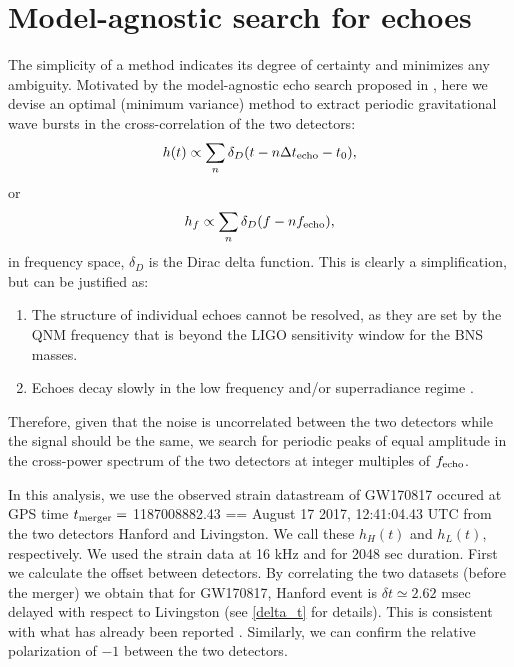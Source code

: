 \documentclass[12pt]{article}
\newcommand{\be}{\begin{equation}}
\newcommand{\ee}{\end{equation}}
\begin{document}
\section{Model-agnostic search for echoes}\label{method}

The simplicity of a method indicates its degree of certainty and minimizes any ambiguity. Motivated by the model-agnostic echo search proposed in \cite{Conklin:2017lwb}, here we devise an optimal (minimum variance) method to extract periodic gravitational wave bursts in the cross-correlation of the two detectors:
\be
h(t) \propto \sum_n \delta_D(t-n\Delta t_{\rm echo} -t_0),
\ee 
or
\be
h_{f} \propto \sum_n \delta_D(f- n f_{\rm echo}), \label{h_f_res}
\ee
in frequency space, $\delta_D$ is the Dirac delta function. This is clearly a simplification, but can be justified as:
\begin{enumerate}
\item The structure of individual echoes cannot be resolved, as they are set by the QNM frequency that is beyond the LIGO sensitivity window for the BNS masses.
\item Echoes decay slowly in the low frequency and/or superradiance regime \cite{Wang:2018gin}.
\end{enumerate}

Therefore, given that the noise is uncorrelated between the two detectors while the signal should be the same, we search for periodic peaks of equal amplitude in the cross-power spectrum of the two detectors at integer multiples of $f_{\rm echo}$. 


In this analysis, we use the observed strain datastream of GW170817 \cite{GW170817} occured at GPS time $t_{\rm{merger}}=$ 1187008882.43 == August 17 2017, 12:41:04.43 UTC from the two detectors Hanford and Livingston. We call these $h_{H}(t)$ and $h_{L}(t)$, respectively. We used the strain data at 16 kHz and for 2048 sec duration. First we calculate the offset between detectors. By correlating the two datasets (before the merger) we obtain that for GW170817, Hanford event is $\delta t \simeq 2.62$ msec delayed with respect to Livingston (see \ref{delta_t} for details). This is consistent with what has already been reported \cite{GBM:2017lvd}. Similarly, we can confirm the relative polarization of $-1$  between the two detectors. %
\end{document}
